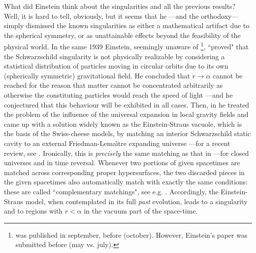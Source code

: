 \documentclass[12pt]{iopart}
\begin{document}
What did Einstein think about the singularities and all the previous results? Well, it is hard to tell, obviously, but it seems that he ---and the orthodoxy--- simply dismissed the known singularities as either a mathematical artifact due to the spherical symmetry, or as unattainable effects beyond the feasibility of the physical world. In the same 1939 Einstein, seemingly unaware of \cite{OS}\footnote{\cite{OS} was published in september, before \cite{E2} (october). However, Einstein's paper was submitted before (may vs. july).}, ``proved" that the Schwarzschild singularity is not physically realizable  \cite{E2} by considering a statistical distribution of particles moving in circular orbits due to its own (spherically symmetric) gravitational field. He concluded that $r\rightarrow \alpha$ cannot be reached for the reason that matter cannot be concentrated arbitrarily as otherwise the constituting particles would reach the speed of light ---and he conjectured that this behaviour will be exhibited in all cases. Then, in \cite{ESt} he treated the problem of the influence of the universal expansion in local gravity fields and came up with a solution widely known as the Einstein-Straus vacuole, which is the basis of the Swiss-cheese models, by matching an interior Schwarzschild static cavity to an external Friedman-Lema\^\i tre expanding universe ---for a recent review, see \cite{MMV}. Ironically, this is {\em precisely} the same matching as that in \cite{OS} ---for closed universes and in time reversal. Whenever two portions of given spacetimes are matched across corresponding proper hypersurfaces, the two discarded pieces in the given spacetimes also automatically match with exactly the same conditions: these are called ``complementary matchings", see e.g. \cite{FST}. Accordingly, the Einstein-Straus model, when contemplated in its full {\em past} evolution, leads to a singularity and to regions with $r<\alpha$ in the vacuum part of the space-time.
\end{document}
